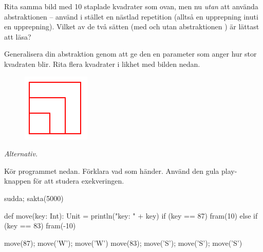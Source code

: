 \Subtask Rita samma bild med 10 staplade kvadrater som ovan, men nu \emph{utan} att använda abstraktionen  -- använd i stället en nästlad repetition (alltså en upprepning inuti en upprepning). Vilket av de två sätten (med och utan abstraktionen ) är lättast att läsa? %

\Subtask Generalisera din abstraktion  genom att ge den en parameter  som anger hur stor kvadraten blir. Rita flera kvadrater i likhet med bilden nedan.

\begin{figure}[H]
\includegraphics{../img/kojo/square-param}
\end{figure}













\Task \emph{Alternativ.} \label{kojo:alt}

\Subtask Kör programmet nedan. Förklara vad som händer. Använd den gula play-knappen för att studera exekveringen.

\begin{Code}
sudda; sakta(5000)

def move(key: Int): Unit = {
  println("key: " + key)
  if (key == 87) fram(10)
  else if (key == 83) fram(-10)
}

move(87); move('W'); move('W')
move(83); move('S'); move('S'); move('S')
\end{Code}

